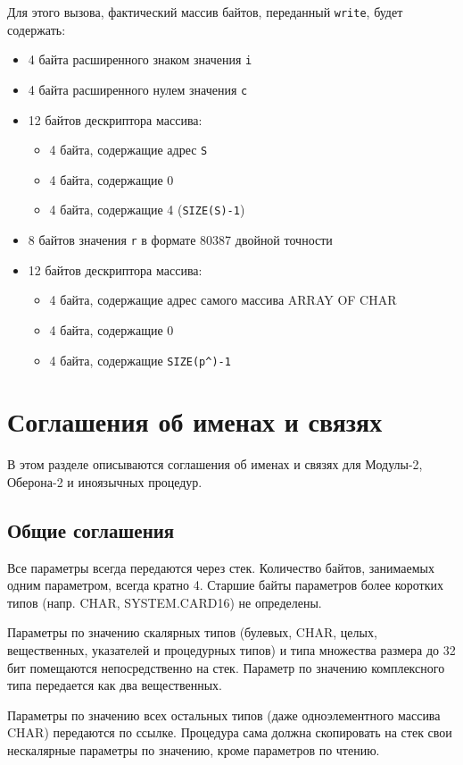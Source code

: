 Для этого вызова, фактический массив байтов, переданный {\tt write},
будет содержать:
\begin{itemize}
\item  4 байта расширенного знаком значения {\tt i}
\item  4 байта расширенного нулем значения {\tt c}
\item  12 байтов дескриптора массива:
\begin{itemize}
    \item 4 байта, содержащие адрес {\tt S}
    \item 4 байта, содержащие 0
    \item 4 байта, содержащие 4 ({\tt SIZE(S)-1})
\end{itemize}
\item  8 байтов значения {\tt r} в формате 80387 двойной точности
\item  12 байтов дескриптора массива:
\begin{itemize}
    \item 4 байта, содержащие адрес самого массива ARRAY OF CHAR
    \item 4 байта, содержащие 0
    \item 4 байта, содержащие \verb|SIZE(p^)-1|
\end{itemize}
\end{itemize}


\section{Соглашения об именах и связях}

В этом разделе описываются соглашения об именах и связях для
Модулы-2, Оберона-2 и иноязычных процедур.

\subsection{Общие соглашения} %

Все параметры всегда передаются через стек. Количество байтов, 
занимаемых одним параметром, всегда кратно 4. Старшие байты
параметров более коротких типов (напр. CHAR, SYSTEM.CARD16) 
не определены.

Параметры по значению скалярных типов (булевых,
CHAR, целых, вещественных, указателей и процедурных типов)
и типа множества размера до 32 бит помещаются непосредственно на стек.
Параметр по значению комплексного типа передается как два 
вещественных.

Параметры по значению всех остальных типов (даже одноэлементного 
массива CHAR) передаются по ссылке. Процедура сама должна скопировать
на стек свои нескалярные параметры по значению, кроме параметров 
по чтению.

